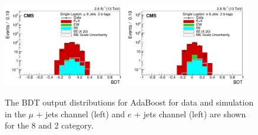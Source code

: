 \begin{figure}[ht!]
    \includegraphics[width=0.48\textwidth]{images/Run2/BDT_Mu29Aug400trees_5MinNodeSize_20nCuts_3MaxDepth_5adaboostbeta_adaBoost_alphaSTune_noMinEvents8nJets2nMtags_StackLogY.pdf}
    \includegraphics[width=0.48\textwidth]{images/Run2/BDT_El29Aug400trees_5MinNodeSize_20nCuts_3MaxDepth_5adaboostbeta_adaBoost_alphaSTune_noMinEvents8nJets2nMtags_StackLogY.pdf} 
    \caption{The BDT output distributions for AdaBoost for data and simulation in the $\mu$ + jets channel (left) and $e$ + jets channel (left) are shown for the 8 \njets and 2 \nMtags category.}
    \label{fig:BDT_Mu29Aug400trees_5MinNodeSize_20nCuts_3MaxDepth_5adaboostbeta_adaBoost_alphaSTune_noMinEvents82}
\end{figure}

